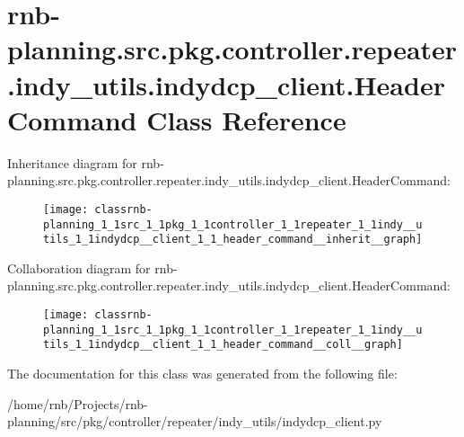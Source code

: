 \hypertarget{classrnb-planning_1_1src_1_1pkg_1_1controller_1_1repeater_1_1indy__utils_1_1indydcp__client_1_1_header_command}{}\section{rnb-\/planning.src.\+pkg.\+controller.\+repeater.\+indy\+\_\+utils.\+indydcp\+\_\+client.\+Header\+Command Class Reference}
\label{classrnb-planning_1_1src_1_1pkg_1_1controller_1_1repeater_1_1indy__utils_1_1indydcp__client_1_1_header_command}


Inheritance diagram for rnb-\/planning.src.\+pkg.\+controller.\+repeater.\+indy\+\_\+utils.\+indydcp\+\_\+client.\+Header\+Command\+:\nopagebreak
\begin{figure}[H]
\begin{center}
\leavevmode
\texttt{[image: classrnb-planning\_1\_1src\_1\_1pkg\_1\_1controller\_1\_1repeater\_1\_1indy\_\_utils\_1\_1indydcp\_\_client\_1\_1\_header\_command\_\_inherit\_\_graph]}
\end{center}
\end{figure}


Collaboration diagram for rnb-\/planning.src.\+pkg.\+controller.\+repeater.\+indy\+\_\+utils.\+indydcp\+\_\+client.\+Header\+Command\+:\nopagebreak
\begin{figure}[H]
\begin{center}
\leavevmode
\texttt{[image: classrnb-planning\_1\_1src\_1\_1pkg\_1\_1controller\_1\_1repeater\_1\_1indy\_\_utils\_1\_1indydcp\_\_client\_1\_1\_header\_command\_\_coll\_\_graph]}
\end{center}
\end{figure}


The documentation for this class was generated from the following file\+:\begin{DoxyCompactItemize}
\item 
/home/rnb/\+Projects/rnb-\/planning/src/pkg/controller/repeater/indy\+\_\+utils/indydcp\+\_\+client.\+py\end{DoxyCompactItemize}
